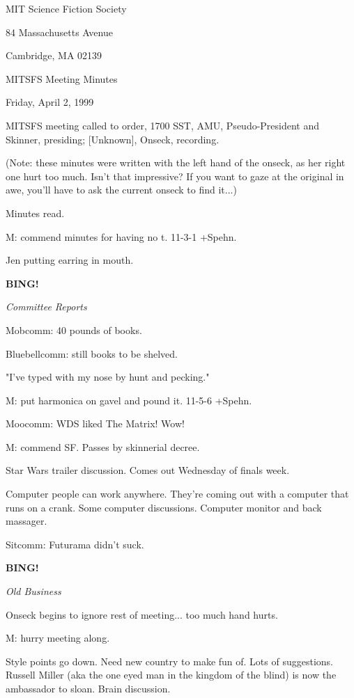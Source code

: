 \documentclass[12pt]{article}
\newcommand{\bing}{{\bf BING!} }
\newcommand{\goto}[1]{\bing \vskip 12pt \centerline{{\em{#1}}}}
\begin{document}
\begin{center}

MIT Science Fiction Society 

84 Massachusetts Avenue

Cambridge, MA 02139

\vspace{12pt}

MITSFS Meeting Minutes 

Friday, April 2, 1999

\end{center}
 
\vspace{18pt}

\setlength{\parskip}{6pt}

\noindent
MITSFS meeting called to order, 1700 SST,
AMU, Pseudo-President and Skinner, presiding; [Unknown], Onseck, recording.

(Note: these minutes were written with the left hand of the onseck, as her right one hurt too much. Isn't that impressive? If you want to gaze at the original in awe, you'll have to ask the current onseck to find it...)

Minutes read.

M: commend minutes for having no t. 11-3-1 +Spehn.

Jen putting earring in mouth.

\goto{Committee Reports}

Mobcomm: 40 pounds of books.

Bluebellcomm: still books to be shelved.

"I've typed with my nose by hunt and pecking."

M: put harmonica on gavel and pound it. 11-5-6 +Spehn.

Moocomm: WDS liked The Matrix! Wow!

M: commend SF. Passes by skinnerial decree.

Star Wars trailer discussion. Comes out Wednesday of finals week.

Computer people can work anywhere. They're coming out with a computer that runs on a crank. Some computer discussions. Computer monitor and back massager.

Sitcomm: Futurama didn't suck.

\goto{Old Business}

Onseck begins to ignore rest of meeting... too much hand hurts.

M: hurry meeting along.

Style points go down. Need new country to make fun of. Lots of suggestions. Russell Miller (aka the one eyed man in the kingdom of the blind) is now the ambassador to sloan. Brain discussion.
\end{document}

